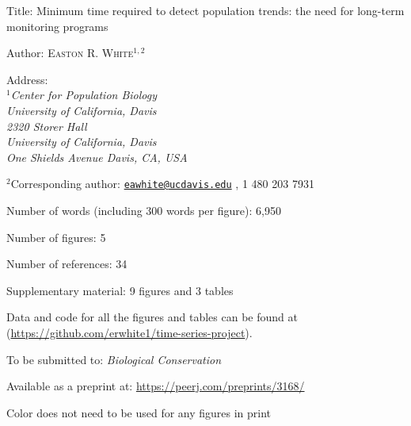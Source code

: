 \documentclass[12pt,]{article}
\title{}
\author{}
\date{}
\begin{document}
Title: Minimum time required to detect population trends: the need for
long-term monitoring programs \vspace{7 mm}

Author: \textsc{Easton R. White$^{1,2}$} \vspace{3 mm}

Address:\emph{
    \\$^1$Center for Population Biology \\
    University of California, Davis \\
    2320 Storer Hall \\
        University of California, Davis \\
        One Shields Avenue Davis, CA, USA} \vspace{3 mm}

\(^2\)Corresponding author:
\href{mailto:eawhite@ucdavis.edu}{\nolinkurl{eawhite@ucdavis.edu}} , 1
480 203 7931 \vspace{3 mm}

Number of words (including 300 words per figure): 6,950 \vspace{1 mm}

Number of figures: 5 \vspace{1 mm}

Number of references: 34 \vspace{1 mm}

Supplementary material: 9 figures and 3 tables \vspace{3 mm}

Data and code for all the figures and tables can be found at
(\url{https://github.com/erwhite1/time-series-project}).

To be submitted to: \emph{Biological Conservation} \vspace{3 mm}

Available as a preprint at: \url{https://peerj.com/preprints/3168/}
\vspace{3 mm}

Color does not need to be used for any figures in print \vspace{3 mm}

\vspace{3 mm}
\end{document}
